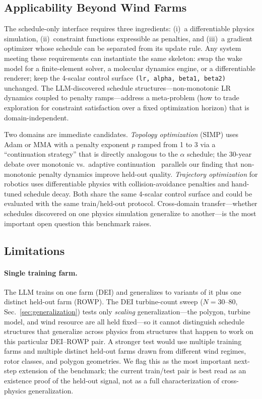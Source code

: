 \subsection{Applicability Beyond Wind Farms}

The schedule-only interface requires three ingredients: (i)~a
differentiable physics simulation, (ii)~constraint functions
expressible as penalties, and (iii)~a gradient optimizer whose
schedule can be separated from its update rule. Any system meeting
these requirements can instantiate the same skeleton: swap the wake
model for a finite-element solver, a molecular dynamics engine, or a
differentiable renderer; keep the 4-scalar control surface
\texttt{(lr, alpha, beta1, beta2)} unchanged. The LLM-discovered
schedule structures---non-monotonic LR dynamics coupled to penalty
ramps---address a meta-problem (how to trade exploration for
constraint satisfaction over a fixed optimization horizon) that is
domain-independent.

Two domains are immediate candidates. \emph{Topology optimization}
(SIMP) uses Adam or MMA with a penalty exponent $p$ ramped from 1 to
3 via a ``continuation strategy'' that is directly analogous to the
$\alpha$ schedule; the 30-year debate over monotonic vs.\ adaptive
continuation~\cite{rojas2015continuation} parallels our finding that
non-monotonic penalty dynamics improve held-out quality.
\emph{Trajectory optimization} for robotics uses differentiable
physics with collision-avoidance penalties and hand-tuned schedule
decay. Both share the same 4-scalar control surface and could be
evaluated with the same train/held-out protocol. Cross-domain
transfer---whether schedules discovered on one physics simulation
generalize to another---is the most important open question this
benchmark raises.

\subsection{Limitations}

\paragraph{Single training farm.}
The LLM trains on one farm (DEI) and generalizes to variants of it
plus one distinct held-out farm (ROWP). The DEI turbine-count sweep
($N=30$--$80$, Sec.~\ref{sec:generalization}) tests only \emph{scaling}
generalization---the polygon, turbine model, and wind resource are all
held fixed---so it cannot distinguish schedule structures that
generalize across physics from structures that happen to work on this
particular DEI--ROWP pair. A stronger test would use multiple training
farms and multiple distinct held-out farms drawn from different wind
regimes, rotor classes, and polygon geometries. We flag this as the
most important next-step extension of the benchmark; the current
train/test pair is best read as an existence proof of the held-out
signal, not as a full characterization of cross-physics
generalization.

